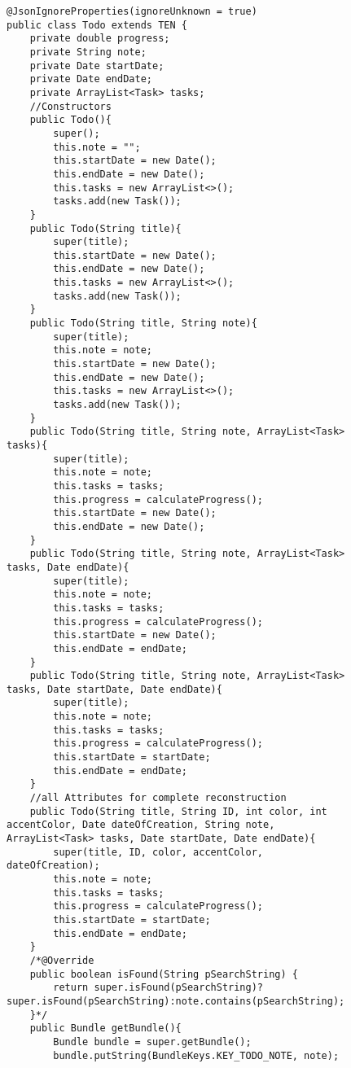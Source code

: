 \begin{figure}[H]
\begin{lstlisting}[caption=Todo (Joscha Nassenstein)]
@JsonIgnoreProperties(ignoreUnknown = true)
public class Todo extends TEN {
    private double progress;
    private String note;
    private Date startDate;
    private Date endDate;
    private ArrayList<Task> tasks;
    //Constructors
    public Todo(){
        super();
        this.note = "";
        this.startDate = new Date();
        this.endDate = new Date();
        this.tasks = new ArrayList<>();
        tasks.add(new Task());
    }
    public Todo(String title){
        super(title);
        this.startDate = new Date();
        this.endDate = new Date();
        this.tasks = new ArrayList<>();
        tasks.add(new Task());
    }
    public Todo(String title, String note){
        super(title);
        this.note = note;
        this.startDate = new Date();
        this.endDate = new Date();
        this.tasks = new ArrayList<>();
        tasks.add(new Task());
    }
    public Todo(String title, String note, ArrayList<Task> tasks){
        super(title);
        this.note = note;
        this.tasks = tasks;
        this.progress = calculateProgress();
        this.startDate = new Date();
        this.endDate = new Date();
    }
    public Todo(String title, String note, ArrayList<Task> tasks, Date endDate){
        super(title);
        this.note = note;
        this.tasks = tasks;
        this.progress = calculateProgress();
        this.startDate = new Date();
        this.endDate = endDate;
    }
    public Todo(String title, String note, ArrayList<Task> tasks, Date startDate, Date endDate){
        super(title);
        this.note = note;
        this.tasks = tasks;
        this.progress = calculateProgress();
        this.startDate = startDate;
        this.endDate = endDate;
    }
    //all Attributes for complete reconstruction
    public Todo(String title, String ID, int color, int accentColor, Date dateOfCreation, String note, ArrayList<Task> tasks, Date startDate, Date endDate){
        super(title, ID, color, accentColor, dateOfCreation);
        this.note = note;
        this.tasks = tasks;
        this.progress = calculateProgress();
        this.startDate = startDate;
        this.endDate = endDate;
    }
    /*@Override
    public boolean isFound(String pSearchString) {
        return super.isFound(pSearchString)?super.isFound(pSearchString):note.contains(pSearchString);
    }*/
    public Bundle getBundle(){
        Bundle bundle = super.getBundle();
        bundle.putString(BundleKeys.KEY_TODO_NOTE, note);

\end{lstlisting}
\end{figure}
